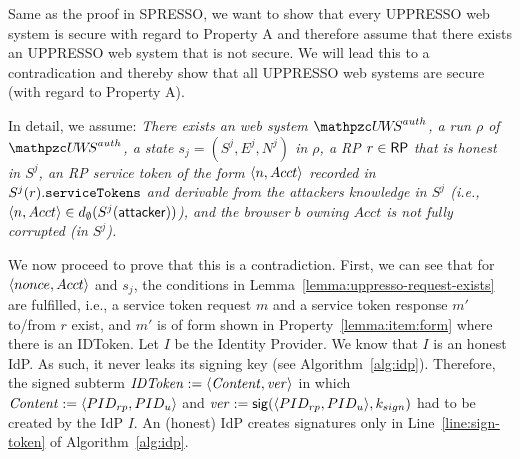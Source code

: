   Same as the proof in SPRESSO, we want to show that every UPPRESSO web system is secure with regard to Property A and therefore assume that there exists an UPPRESSO web system that is not secure. We will lead this to a contradication and thereby show that all UPPRESSO web systems are secure (with regard to Property A).
  
  
  In detail, we assume: \emph{There exists an \uppresso web 
  system $\uppressoauthwebsystem$, a run $\rho$ of 
  $\uppressoauthwebsystem$, a state $s_j = (S^j, E^j, N^j)$ 
  in $\rho$, a RP $r\in \mathsf{RP}$ that is honest in $S^j$, 
  an RP service token of the form $\langle {{}n, Acct} \rangle$
  recorded in $S^j(r).\mathtt{serviceTokens}$ and derivable from 
  the attackers knowledge in $S^j$ (i.e., $\langle {{}n, Acct} \rangle \in
  d_{\emptyset}(S^j(\mathsf{attacker}))$), and the browser $b$ 
  owning $Acct$ is not fully corrupted (in $S^j$).}
  
  We now proceed to prove that this is a contradiction. 
  First, we can see that for $\langle nonce, Acct\rangle$ and $s_j$, 
  the conditions in Lemma~\ref{lemma:uppresso-request-exists} 
  are fulfilled, i.e., a service token request $m$ and a 
  service token response $m'$ to/from $r$ exist, and $m'$ is 
  of form shown in Property~\ref{lemma:item:form} where there is an IDToken.
  Let $I$ be the Identity Provider. 
  We know that $I$ is an honest IdP.
  As such, it never leaks its signing key (see Algorithm~\ref{alg:idp}). 
  Therefore, the signed subterm $\mathit{IDToken} := \langle {{}\mathit{Content}, \mathit{ver}} \rangle$ in which
  $\mathit{Content} := \langle {{}PID_{rp}, PID_u} \rangle$ and 
  $\mathit{ver} := \mathsf{sig}({\langle PID_{rp},PID_u\rangle},{k_{sign}})$ 
  had to be created by the IdP $I$. 
  An (honest) IdP creates signatures only in Line~\ref{line:sign-token} of Algorithm~\ref{alg:idp}.
  
